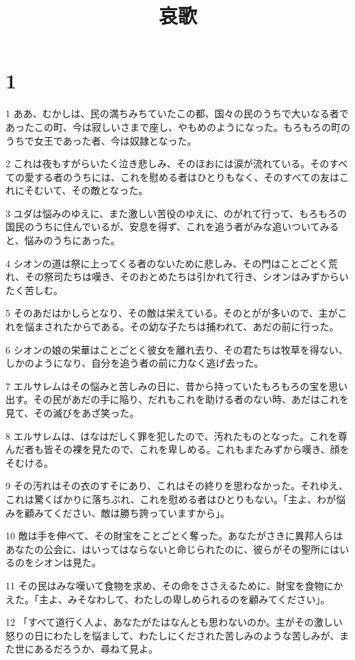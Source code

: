 

\title{哀歌}


\chapter{1}

\par 1 ああ、むかしは、民の満ちみちていたこの都、国々の民のうちで大いなる者であったこの町、今は寂しいさまで座し、やもめのようになった。もろもろの町のうちで女王であった者、今は奴隷となった。
\par 2 これは夜もすがらいたく泣き悲しみ、そのほおには涙が流れている。そのすべての愛する者のうちには、これを慰める者はひとりもなく、そのすべての友はこれにそむいて、その敵となった。
\par 3 ユダは悩みのゆえに、また激しい苦役のゆえに、のがれて行って、もろもろの国民のうちに住んでいるが、安息を得ず、これを追う者がみな追いついてみると、悩みのうちにあった。
\par 4 シオンの道は祭に上ってくる者のないために悲しみ、その門はことごとく荒れ、その祭司たちは嘆き、そのおとめたちは引かれて行き、シオンはみずからいたく苦しむ。
\par 5 そのあだはかしらとなり、その敵は栄えている。そのとがが多いので、主がこれを悩まされたからである。その幼な子たちは捕われて、あだの前に行った。
\par 6 シオンの娘の栄華はことごとく彼女を離れ去り、その君たちは牧草を得ない、しかのようになり、自分を追う者の前に力なく逃げ去った。
\par 7 エルサレムはその悩みと苦しみの日に、昔から持っていたもろもろの宝を思い出す。その民があだの手に陥り、だれもこれを助ける者のない時、あだはこれを見て、その滅びをあざ笑った。
\par 8 エルサレムは、はなはだしく罪を犯したので、汚れたものとなった。これを尊んだ者も皆その裸を見たので、これを卑しめる。これもまたみずから嘆き、顔をそむける。
\par 9 その汚れはその衣のすそにあり、これはその終りを思わなかった。それゆえ、これは驚くばかりに落ちぶれ、これを慰める者はひとりもない。「主よ、わが悩みを顧みてください、敵は勝ち誇っていますから」。
\par 10 敵は手を伸べて、その財宝をことごとく奪った。あなたがさきに異邦人らはあなたの公会に、はいってはならないと命じられたのに、彼らがその聖所にはいるのをシオンは見た。
\par 11 その民はみな嘆いて食物を求め、その命をささえるために、財宝を食物にかえた。「主よ、みそなわして、わたしの卑しめられるのを顧みてください」。
\par 12 「すべて道行く人よ、あなたがたはなんとも思わないのか。主がその激しい怒りの日にわたしを悩まして、わたしにくだされた苦しみのような苦しみが、また世にあるだろうか、尋ねて見よ。
